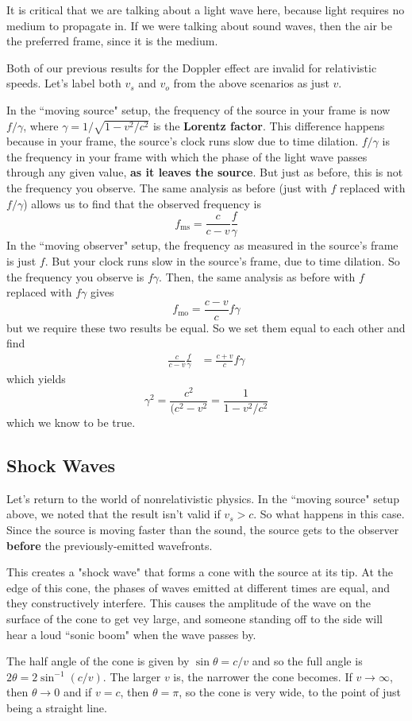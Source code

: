 It is critical that we are talking about a light wave here, because light requires no medium to propagate in. If we were talking about sound waves, then the air be the preferred frame, since it is the medium. 

Both of our previous results for the Doppler effect are invalid for relativistic speeds. Let's label both $v_s$ and $v_o$ from the above scenarios as just $v$.

In the ``moving source" setup, the frequency of the source in your frame is now $f/\gamma$, where $\gamma = 1/\sqrt{1-v^2/c^2}$ is the \textbf{Lorentz factor}. This difference happens because in your frame, the source's clock runs slow due to time dilation. $f/\gamma$ is the frequency in your frame with which the phase of the light wave passes through any given value, \textbf{as it leaves the source}. But just as before, this is not the frequency you observe. The same analysis as before (just with $f$ replaced with $f/\gamma$) allows us to find that the observed frequency is
\[ f_\text{ms} = \frac{c}{c-v}\frac{f}{\gamma}\]
In the ``moving observer" setup, the frequency as measured in the source's frame is just $f$. But your clock runs slow in the source's frame, due to time dilation. So the frequency you observe is $f\gamma$. Then, the same analysis as before with $f$ replaced with $f\gamma$ gives
\[ f_\text{mo} = \frac{c-v}{c} f\gamma \]
but we require these two results be equal. So we set them equal to each other and find
\begin{align*}
    \frac{c}{c-v}\frac{f}{\gamma} &= \frac{c+v}{c}f\gamma
\end{align*}
which yields
\[ \gamma^2 = \frac{c^2}{(c^2-v^2} = \frac{1}{1-v^2/c^2}\]
which we know to be true.
\subsection*{Shock Waves}
Let's return to the world of nonrelativistic physics. In the ``moving source" setup above, we noted that the result isn't valid if $v_s > c$. So what happens in this case. Since the source is moving faster than the sound, the source gets to the observer \textbf{before} the previously-emitted wavefronts. 

This creates a "shock wave" that forms a cone with the source at its tip. At the edge of this cone, the phases of waves emitted at different times are equal, and they constructively interfere. This causes the amplitude of the wave on the surface of the cone to get vey large, and someone standing off to the side will hear a loud ``sonic boom" when the wave passes by. 

The half angle of the cone is given by $\sin\theta = c/v$ and so the full angle is $2\theta = 2\sin^{-1}(c/v)$. The larger $v$ is, the narrower the cone becomes. If $v\to\infty$, then $\theta\to 0$ and if $v=c$, then $\theta  = \pi$, so the cone is very wide, to the point of just being a straight line. 